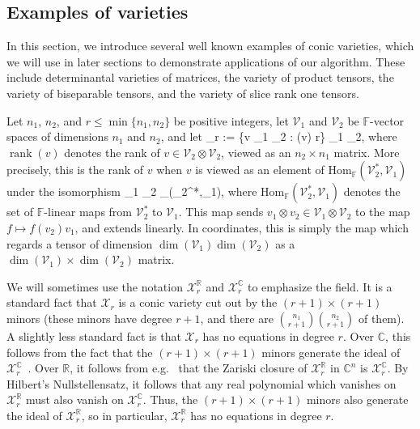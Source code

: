 \documentclass[11pt]{article}
\theoremstyle{definition}
\newcommand{\rank}{\operatorname{rank}}
\newcommand{\setft}[1]{\mathrm{#1}}
\newcommand{\complex}{\mathbb{C}}
\newcommand{\field}{\mathbb{F}}
\newcommand{\real}{\mathbb{R}}
\newcommand\X{\mathcal{X}}
\newcommand\V{\mathcal{V}}
\def\ba#1\ea{\begin{align}#1\end{align}}
\begin{document}
\subsection{Examples of varieties}\label{sec:XR}

In this section, we introduce several well known examples of conic varieties, which we will use in later sections to demonstrate applications of our algorithm. These include determinantal varieties of matrices, the variety of product tensors, the variety of biseparable tensors, and the variety of slice rank one tensors.

Let $n_1$, $n_2$, and $r\leq \min\{n_1,n_2\}$ be positive integers, let $\V_1$ and $\V_2$ be $\field$-vector spaces of dimensions $n_1$ and $n_2$, and let
\ba\label{eq:XR}
\X_r := \{v \in \V_1 \otimes \V_2 : \rank(v) \leq r\} \subseteq \V_1 \otimes \V_2,
\ea
where $\rank(v)$ denotes the rank of $v \in \V_2 \otimes \V_2$, viewed as an $n_2 \times n_1$ matrix. More precisely, this is the rank of $v$ when $v$ is viewed as an element of $\setft{Hom}_{\field}(\V_2^*,\V_1)$ under the isomorphism
\ba\label{eq:tensor_iso}
\V_1 \otimes \V_2 \cong \setft{Hom}_{\field}(\V_2^*,\V_1),
\ea
where $\setft{Hom}_{\field}(\V_2^*,\V_1)$ denotes the set of $\field$-linear maps from $\V_2^*$ to $\V_1$. This map sends $v_1 \otimes v_2 \in \V_1 \otimes \V_2$ to the map $f \mapsto f(v_2) v_1$, and extends linearly. In coordinates, this is simply the map which regards a tensor of dimension $\dim(\V_1) \dim(\V_2)$ as a $\dim(\V_1)\times \dim(\V_2)$ matrix.

We will sometimes use the notation $\X_r^{\real}$ and $\X_r^{\complex}$ to emphasize the field.  It is a standard fact that $\X_r$ is a conic variety cut out by the $(r+1) \times (r+1)$ minors (these minors have degree ${r+1}$, and there are $\binom{n_1}{r+1}\binom{n_2}{r+1}$ of them). A slightly less standard fact is that $\X_r$ has no equations in degree $r$. Over $\complex$, this follows from the fact that the $(r+1)\times (r+1)$ minors generate the ideal of $\X_r^{\complex}$~\cite{harris2013algebraic}. Over $\real$, it follows from e.g.~\cite[Theorem 2.2.9.2]{mangolte2020real} that the Zariski closure of $\X_r^{\real}$ in $\complex^n$ is $\X_r^{\complex}$. By Hilbert's Nullstellensatz, it follows that any real polynomial which vanishes on $\X_r^{\real}$ must also vanish on $\X_r^{\complex}$. Thus, the $(r+1)\times (r+1)$ minors also generate the ideal of $\X_r^{\real}$, so in particular, $\X_r^{\real}$ has no equations in degree $r$.
\end{document}
